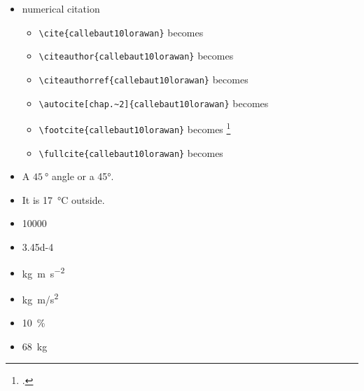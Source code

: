 \begin{itemize}
\begin{itemize}
    \item \cref{fig:example}
    \item \cref{tab:example}
    \item \cref{ch:introduction}
    \item \cref{eq:emc2}


    \item \verb!\cref{fig:example}! becomes \cref{fig:example}
    \item \verb!\cref{tab:example}! becomes \cref{tab:example}
    \item \verb!\cref{ch:introduction}! becomes \cref{ch:introduction}
    \item \cref{eq:emc2}


\end{itemize}
\item numerical citation~\cite{ottoylorawan}
\begin{itemize}
    \item \verb!\cite{callebaut10lorawan}! becomes \cite{callebaut10lorawan}

    \item \verb!\citeauthor{callebaut10lorawan}! becomes \citeauthor{callebaut10lorawan}
    \item \verb!\citeauthorref{callebaut10lorawan}! becomes 
    \item \verb!\autocite[chap.~2]{callebaut10lorawan}! becomes \autocite[chap.~2]{callebaut10lorawan}
    \item \verb!\footcite{callebaut10lorawan}! becomes \footcite{callebaut10lorawan}
    \item \verb!\fullcite{callebaut10lorawan}! becomes 
\end{itemize}

    \item A $\SI{45}{\degree}$ angle or a \ang{45}.

    \item It is \SI{17}{\degreeCelsius} outside.

    \item  \num{10000}
    \item \num{3.45d-4}

    \item \si{\kilo\gram\meter\per\square\second} 
    \item \si{kg.m/s^2} %

    \item \SI{10}{\percent}
    \item \SI{68}{kg}
\end{itemize}


